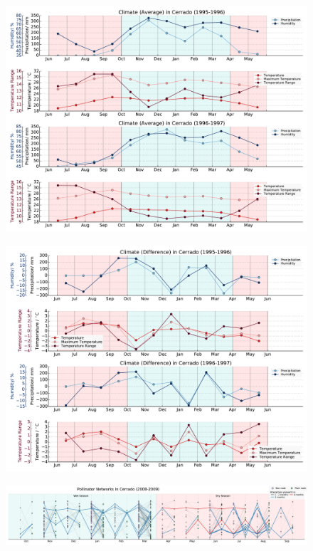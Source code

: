 \documentclass[11pt]{article}
\begin{document}
\begin{landscape}
\begin{figure}[H]
  \centering
    \includegraphics[width=250mm]{AvgClimateAcrossTime(Old).pdf}
\end{figure}

\begin{figure}[H]
  \centering
    \includegraphics[width=250mm]{DiffClimateAcrossTime(Old).pdf}
\end{figure}

\begin{figure}[H]
  \centering
    \includegraphics[width=255mm]{network(new).pdf}
\end{figure}


\end{landscape}
\end{document}
